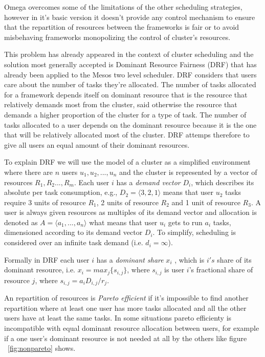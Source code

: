 \documentclass{report}                     %
\begin{document}
Omega overcomes some of the limitations of the other
scheduling strategies, however in it's basic version it doesn't
provide any control mechanism to ensure that the repartition of
resources between the frameworks is fair or to avoid misbehaving
frameworks monopolizing the control of cluster's resources.

This problem has already appeared in the context of cluster scheduling
and the solution most generally accepted is Dominant Resource Fairness
(DRF) \cite{ghodsi2011dominant} that has already been applied to the
Mesos two level scheduler. DRF considers that users care about the
number of tasks they're allocated. The number of tasks allocated for a
framework depends itself on dominant resource that is the resource
that relatively demands most from the cluster, said otherwise the
resource that demands a higher proportion of the cluster for a type of
task. The number of tasks allocated to a user depends on the dominant
resource because it is the one that will be relatively allocated most
of the cluster. DRF attemps therefore to give all users an equal
amount of their dominant resources.

To explain DRF we will use the model of a cluster as a simplified
environment where there are $n$ users $u_{1},u_{2},...,u_{n}$ and the
cluster is represented by a vector of resources
$R_{1},R_{2}...,R_{m}$. Each user $i$ has a \emph{demand vector}
$D_{i}$, which describes its absolute per task consumption, e.g.,
$D_{2} = \langle 3, 2, 1 \rangle$ means that user $u_{2}$ tasks
require 3 units of resource $R_{1}$, 2 units of resource $R_{2}$ and 1
unit of resource $R_{3}$. A user is always given resources as
multiples of its demand vector and allocation is denoted as $A =
\langle a_{1},...,a_{n} \rangle$ what means that user $u_{i}$ gets to
run $a_{i}$ tasks, dimensioned according to its demand vector
$D_{i}$. To simplify, scheduling is considered over an infinite task
demand (i.e. $d_{i} = \infty$).

Formally in DRF each user $i$ has a \emph{dominant share} $x_{i}$ ,
which is $i's$ share of its dominant resource, i.e. $x_{i} = max_{j}\{s_{i,j}\}$,
where $s_{i,j}$ is user $i$'s fractional share of resource $j$, where
$s_{i,j} = a_{i}D_{i,j}/r_{j}$.

An repartition of resources is \emph{Pareto efficient} if it's impossible
to find another repartition where at least one user has more tasks
allocated and all the other users have at least the same tasks. In some 
situations pareto efficienty is incompatible with equal dominant resource
allocation between users, for example if a one user's dominant resource
is not needed at all by the others like figure ~\ref{fig:nonpareto} shows. \\
\end{document}
